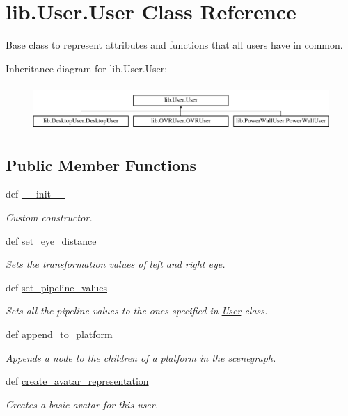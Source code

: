 \hypertarget{classlib_1_1User_1_1User}{\section{lib.\-User.\-User \-Class \-Reference}
\label{classlib_1_1User_1_1User}
}


\-Base class to represent attributes and functions that all users have in common.  


\-Inheritance diagram for lib.\-User.\-User\-:\begin{figure}[H]
\begin{center}
\leavevmode
\includegraphics[height=1.752739cm]{classlib_1_1User_1_1User}
\end{center}
\end{figure}
\subsection*{\-Public \-Member \-Functions}
\begin{DoxyCompactItemize}
\item 
def \hyperlink{classlib_1_1User_1_1User_a883183562a0fdf0c781066b8ebc6151c}{\-\_\-\-\_\-init\-\_\-\-\_\-}
\begin{DoxyCompactList}\small\item\em \-Custom constructor. \end{DoxyCompactList}\item 
def \hyperlink{classlib_1_1User_1_1User_a7457c205f3ae55a20304124c48c4e33f}{set\-\_\-eye\-\_\-distance}
\begin{DoxyCompactList}\small\item\em \-Sets the transformation values of left and right eye. \end{DoxyCompactList}\item 
def \hyperlink{classlib_1_1User_1_1User_ae5fcbc18c31548304edb21eae87baa69}{set\-\_\-pipeline\-\_\-values}
\begin{DoxyCompactList}\small\item\em \-Sets all the pipeline values to the ones specified in \hyperlink{classlib_1_1User_1_1User}{\-User} class. \end{DoxyCompactList}\item 
def \hyperlink{classlib_1_1User_1_1User_a7ed5a075270b3fd775bf0fd237753e6f}{append\-\_\-to\-\_\-platform}
\begin{DoxyCompactList}\small\item\em \-Appends a node to the children of a platform in the scenegraph. \end{DoxyCompactList}\item 
def \hyperlink{classlib_1_1User_1_1User_a2087887f74d08925b51e98d439feb6f6}{create\-\_\-avatar\-\_\-representation}
\begin{DoxyCompactList}\small\item\em \-Creates a basic avatar for this user. \end{DoxyCompactList}\end{DoxyCompactItemize}
